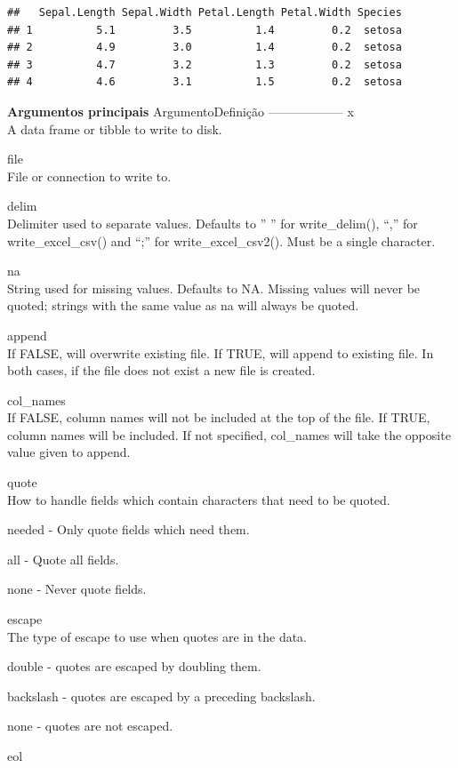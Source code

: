 \documentclass[
]{book}
\theoremstyle{definition}
\theoremstyle{definition}
\theoremstyle{definition}
\theoremstyle{definition}
\theoremstyle{remark}
\begin{document}
\begin{verbatim}
##   Sepal.Length Sepal.Width Petal.Length Petal.Width Species
## 1          5.1         3.5          1.4         0.2  setosa
## 2          4.9         3.0          1.4         0.2  setosa
## 3          4.7         3.2          1.3         0.2  setosa
## 4          4.6         3.1          1.5         0.2  setosa
\end{verbatim}

\textbf{Argumentos principais}
Argumento\textbar Definição
---------\textbar---------
x\\
A data frame or tibble to write to disk.

file\\
File or connection to write to.

delim\\
Delimiter used to separate values. Defaults to '' '' for write\_delim(), ``,'' for write\_excel\_csv() and ``;'' for write\_excel\_csv2(). Must be a single character.

na\\
String used for missing values. Defaults to NA. Missing values will never be quoted; strings with the same value as na will always be quoted.

append\\
If FALSE, will overwrite existing file. If TRUE, will append to existing file. In both cases, if the file does not exist a new file is created.

col\_names\\
If FALSE, column names will not be included at the top of the file. If TRUE, column names will be included. If not specified, col\_names will take the opposite value given to append.

quote\\
How to handle fields which contain characters that need to be quoted.

needed - Only quote fields which need them.

all - Quote all fields.

none - Never quote fields.

escape\\
The type of escape to use when quotes are in the data.

double - quotes are escaped by doubling them.

backslash - quotes are escaped by a preceding backslash.

none - quotes are not escaped.

eol
\end{document}
